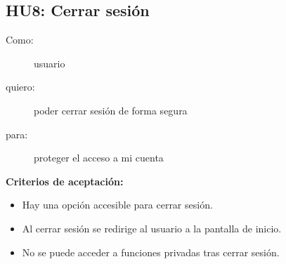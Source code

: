 \subsection*{HU8: Cerrar sesión}
\begin{description}
  \item[Como:] usuario
  \item[quiero:] poder cerrar sesión de forma segura
  \item[para:] proteger el acceso a mi cuenta
\end{description}

\textbf{Criterios de aceptación:}
\begin{itemize}
    \item Hay una opción accesible para cerrar sesión.
    \item Al cerrar sesión se redirige al usuario a la pantalla de inicio.
    \item No se puede acceder a funciones privadas tras cerrar sesión.
\end{itemize}
